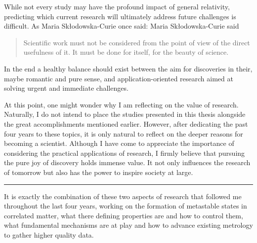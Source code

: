 While not every study may have the profound impact of general relativity, predicting which current research will ultimately address future challenges is difficult.
As Maria Skłodowska-Curie once said:
Maria Skłodowska-Curie said
\begin{quote} 
	\centering 
	 Scientific work must not be considered from the point of view of the direct usefulness of it. It must be done for itself, for the beauty of science.
\end{quote}
In the end a healthy balance should exist between the aim for discoveries in their, maybe romantic and pure sense, and application-oriented research aimed at solving urgent and immediate challenges.

At this point, one might wonder why I am reflecting on the value of research.
Naturally, I do not intend to place the studies presented in this thesis alongside the great accomplishments mentioned earlier.
However, after dedicating the past four years to these topics, it is only natural to reflect on the deeper reasons for becoming a scientist.
Although I have come to appreciate the importance of considering the practical applications of research, I firmly believe that pursuing the pure joy of discovery holds immense value.
It not only influences the research of tomorrow but also has the power to inspire society at large.

\begin{center}
	\rule{0.3\textwidth}{.8pt}
\end{center}

It is exactly the combination of these two aspects of research that followed me throughout the last four years, working on the formation of metastable states in correlated matter, what there defining properties are and how to control them, what fundamental mechanisms are at play and how to advance existing metrology to gather higher quality data.

